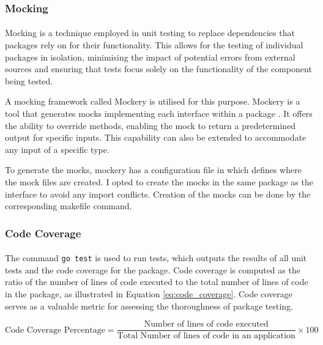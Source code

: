 \documentclass[12pt, conference, final, a4paper, onecolumn, compsoc]{IEEEtran}
\begin{document}
\subsubsection*{Mocking}
\paragraph{}

Mocking is a technique employed in unit testing to replace dependencies that
packages rely on for their functionality. This allows for the testing of
individual packages in isolation, minimising the impact of potential errors from
external sources and ensuring that tests focus solely on the functionality of
the component being tested.

A mocking framework called Mockery is utilised for this purpose. Mockery is a
tool that generates mocks implementing each interface within a package
\citep{go-tools}. It offers the ability to override methods, enabling the mock
to return a predetermined output for specific inputs. This capability can also
be extended to accommodate any input of a specific type.

To generate the mocks, mockery has a configuration file in which defines where
the mock files are created. I opted to create the mocks in the same package as
the interface to avoid any import conflicts. Creation of the mocks can be done
by the corresponding makefile command.

\subsubsection*{Code Coverage}
\paragraph{}

The command \texttt{go test} is used to run tests, which outputs the results of
all unit tests and the code coverage for the package. Code coverage is computed
as the ratio of the number of lines of code executed to the total number of
lines of code in the package, as illustrated in Equation \ref{eq:code_coverage}.
Code coverage serves as a valuable metric for assessing the thoroughness of
package testing.

\begin{equation} \text{Code Coverage Percentage} = \frac{\text{Number of lines
      of code executed}}{\text{Total Number of lines of code in an
      application}} \times 100
  \label{eq:code_coverage}
\end{equation}
\end{document}
